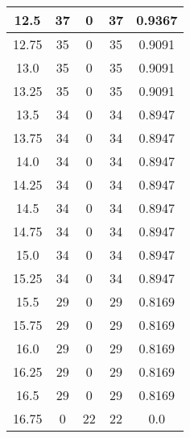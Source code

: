 \documentclass[letterpaper, 12pt]{article}
\begin{document}
\begin{longtable}{|c|c|c|c|c|}
12.5 & 37 & 0 & 37 & 0.9367 \\
\hline
12.75 & 35 & 0 & 35 & 0.9091 \\
\hline
13.0 & 35 & 0 & 35 & 0.9091 \\
\hline
13.25 & 35 & 0 & 35 & 0.9091 \\
\hline
13.5 & 34 & 0 & 34 & 0.8947 \\
\hline
13.75 & 34 & 0 & 34 & 0.8947 \\
\hline
14.0 & 34 & 0 & 34 & 0.8947 \\
\hline
14.25 & 34 & 0 & 34 & 0.8947 \\
\hline
14.5 & 34 & 0 & 34 & 0.8947 \\
\hline
14.75 & 34 & 0 & 34 & 0.8947 \\
\hline
15.0 & 34 & 0 & 34 & 0.8947 \\
\hline
15.25 & 34 & 0 & 34 & 0.8947 \\
\hline
15.5 & 29 & 0 & 29 & 0.8169 \\
\hline
15.75 & 29 & 0 & 29 & 0.8169 \\
\hline
16.0 & 29 & 0 & 29 & 0.8169 \\
\hline
16.25 & 29 & 0 & 29 & 0.8169 \\
\hline
16.5 & 29 & 0 & 29 & 0.8169 \\
\hline
16.75 & 0 & 22 & 22 & 0.0 \\
\hline
\end{longtable}
\end{document}
